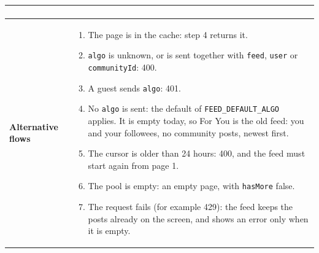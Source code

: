 {\begin{longtable}{@{}>{\raggedright\arraybackslash}p{2.5cm} >{\raggedright\arraybackslash}p{\dimexpr\textwidth-2.5cm-2\tabcolsep\relax}@{}}
\begin{enumerate}[nosep,leftmargin=*,label=\arabic*.]
  \end{enumerate} \\
  \midrule
  \textbf{Alternative flows} &
  \begin{enumerate}[nosep,leftmargin=*,label=A\arabic*.]
    \item The page is in the cache: step 4 returns it.
    \item \texttt{algo} is unknown, or is sent together with \texttt{feed}, \texttt{user} or \texttt{communityId}: 400.
    \item A guest sends \texttt{algo}: 401.
    \item No \texttt{algo} is sent: the default of \texttt{FEED\_DEFAULT\_ALGO} applies. It is empty today, so For You is the old feed: you and your followees, no community posts, newest first.
    \item The cursor is older than 24 hours: 400, and the feed must start again from page 1.
    \item The pool is empty: an empty page, with \texttt{hasMore} false.
    \item The request fails (for example 429): the feed keeps the posts already on the screen, and shows an error only when it is empty.
  \end{enumerate} \\
  \bottomrule
\end{longtable}}

